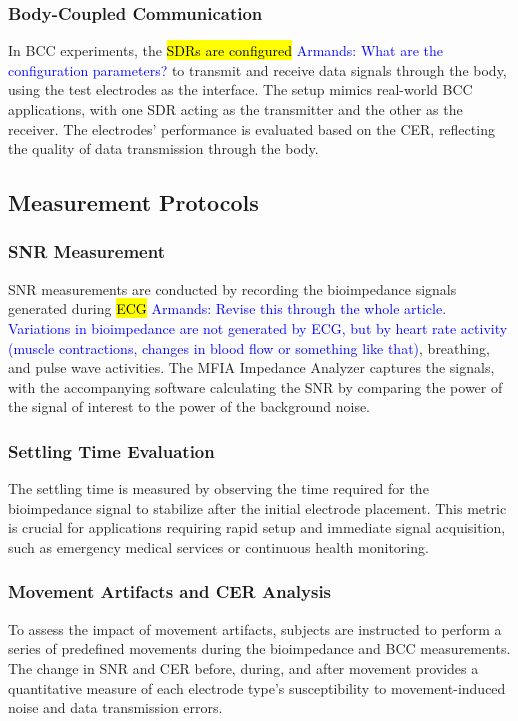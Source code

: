 \documentclass[conference]{IEEEtran}
\newcommand{\notea}[1]{\textcolor{blue}{Armands: #1}}
\begin{document}
\subsubsection{Body-Coupled Communication}
In BCC experiments, the \hl{SDRs are configured} \notea{What are the configuration parameters?} to transmit and receive data signals through the body, using the test electrodes as the interface. The setup mimics real-world BCC applications, with one SDR acting as the transmitter and the other as the receiver. The electrodes' performance is evaluated based on the CER, reflecting the quality of data transmission through the body.

\subsection{Measurement Protocols}

\subsubsection{SNR Measurement}
SNR measurements are conducted by recording the bioimpedance signals generated during \hl{ECG} \notea{Revise this through the whole article. Variations in bioimpedance are not generated by ECG, but by heart rate activity (muscle contractions, changes in blood flow or something like that)}, breathing, and pulse wave activities. The MFIA Impedance Analyzer captures the signals, with the accompanying software calculating the SNR by comparing the power of the signal of interest to the power of the background noise.

\subsubsection{Settling Time Evaluation}
The settling time is measured by observing the time required for the bioimpedance signal to stabilize after the initial electrode placement. This metric is crucial for applications requiring rapid setup and immediate signal acquisition, such as emergency medical services or continuous health monitoring.

\subsubsection{Movement Artifacts and CER Analysis}
To assess the impact of movement artifacts, subjects are instructed to perform a series of predefined movements during the bioimpedance and BCC measurements. The change in SNR and CER before, during, and after movement provides a quantitative measure of each electrode type's susceptibility to movement-induced noise and data transmission errors.
\end{document}
